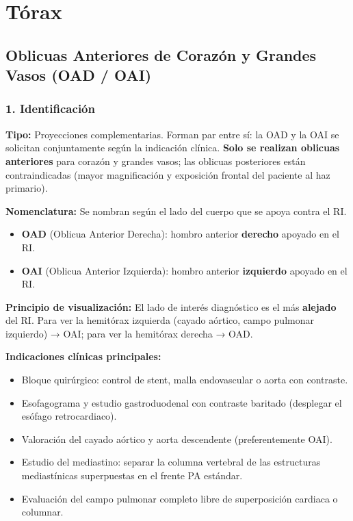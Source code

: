 		\section{Tórax}
		
		\subsection{Oblicuas Anteriores de Corazón y Grandes Vasos (OAD / OAI)}
		
		\subsubsection*{1. Identificación}
		
		\textbf{Tipo:} Proyecciones complementarias. Forman par entre sí: la OAD y la OAI se
		solicitan conjuntamente según la indicación clínica. \textbf{Solo se realizan oblicuas
			anteriores} para corazón y grandes vasos; las oblicuas posteriores están contraindicadas
		(mayor magnificación y exposición frontal del paciente al haz primario).
		
		\textbf{Nomenclatura:} Se nombran según el lado del cuerpo que se apoya contra el RI.
		
		  \begin{tcolorbox}[colback=red!5!white, colframe=red!80!black, fonttitle=\bfseries, title=Importante]
			\begin{itemize}
				\item \textbf{OAD} (Oblicua Anterior Derecha): hombro anterior \textbf{derecho} apoyado en el RI.
				\item \textbf{OAI} (Oblicua Anterior Izquierda): hombro anterior \textbf{izquierdo} apoyado en el RI.
			\end{itemize}
		\end{tcolorbox}
		
		\textbf{Principio de visualización:} El lado de interés diagnóstico es el más \textbf{alejado}
		del RI. Para ver la hemitórax izquierda (cayado aórtico, campo pulmonar izquierdo) → OAI;
		para ver la hemitórax derecha → OAD.
		
		\textbf{Indicaciones clínicas principales:}
		\begin{itemize}
			\item Bloque quirúrgico: control de stent, malla endovascular o aorta con contraste.
			\item Esofagograma y estudio gastroduodenal con contraste baritado (desplegar el esófago retrocardiaco).
			\item Valoración del cayado aórtico y aorta descendente (preferentemente OAI).
			\item Estudio del mediastino: separar la columna vertebral de las estructuras mediastínicas
			superpuestas en el frente PA estándar.
			\item Evaluación del campo pulmonar completo libre de superposición cardiaca o columnar.
		\end{itemize}
		

